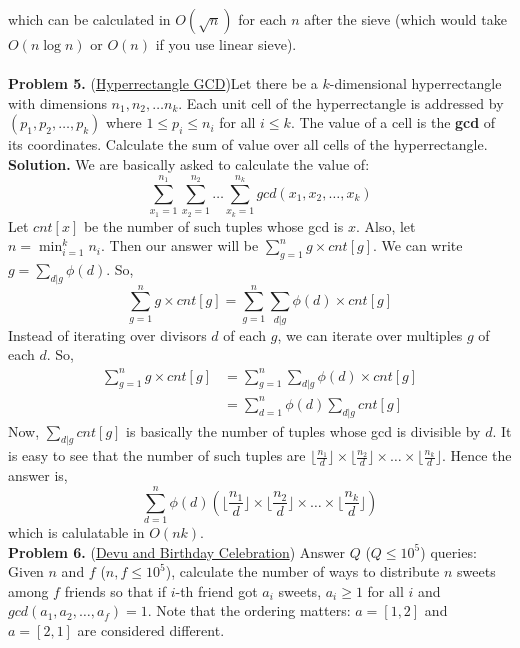 \documentclass[11pt]{article}
\begin{document}
which can be calculated in $O(\sqrt{n})$ for each $n$ after the sieve (which would take $O(n \log n)$ or $O(n)$ if you use linear sieve). \\ \\
\textbf{Problem 5.} (\href{https://www.hackerrank.com/challenges/hyperrectangle-gcd/problem}{Hyperrectangle GCD})Let there be a $k$-dimensional hyperrectangle with dimensions $n_1, n_2, \dots n_k$. Each unit cell of the hyperrectangle is addressed by $(p_1, p_2, \dots , p_k)$ where $1 \leq p_i \leq n_i$ for all $i \leq k$. The value of a cell is the \textbf{gcd} of its coordinates. Calculate the sum of value over all cells of the hyperrectangle.\\
\textbf{Solution.} We are basically asked to calculate the value of: 
$$ \sum_{x_1 = 1}^{n_1} \sum_{x_2 = 1}^{n_2} \dots \sum_{x_k = 1}^{n_k} gcd(x_1, x_2, \dots, x_k)$$
Let $cnt[x]$ be the number of such tuples whose gcd is $x$. Also, let $n = \min_{i = 1}^{k} n_i$. Then our answer will be $\sum_{g = 1}^{n} g \times cnt[g]$. We can write $g = \sum_{d | g} \phi(d)$. So,
  $$\sum_{g = 1}^{n} g \times cnt[g] = \sum_{g = 1}^{n} \sum_{d | g} \phi(d) \times cnt[g]$$
Instead of iterating over divisors $d$ of each $g$, we can iterate over multiples $g$ of each $d$. So,
\begin{align*}
  \sum_{g = 1}^{n} g \times cnt[g] &= \sum_{g = 1}^{n} \sum_{d | g} \phi(d) \times cnt[g]\\
                                   &= \sum_{d = 1}^{n} \phi(d) \sum_{d | g} cnt[g]
\end{align*}
Now, $\sum_{d | g} cnt[g]$ is basically the number of tuples whose gcd is divisible by $d$. It is easy to see that the number of such tuples are $\lfloor \frac{n_1}{d} \rfloor \times \lfloor \frac{n_2}{d} \rfloor \times \dots \times \lfloor \frac{n_k}{d} \rfloor$. Hence the answer is,
$$\sum_{d = 1}^{n} \phi(d) (\lfloor \frac{n_1}{d} \rfloor \times \lfloor \frac{n_2}{d} \rfloor \times \dots \times \lfloor \frac{n_k}{d} \rfloor)$$
which is calulatable in $O(nk)$. \\
\textbf{Problem 6.} (\href{https://codeforces.com/problemset/problem/439/E}{Devu and Birthday Celebration}) Answer $Q$ ($Q \leq 10^5$) queries: Given $n$ and $f$ ($n, f \leq 10^5$), calculate the number of ways to distribute $n$ sweets among $f$ friends so that if $i$-th friend got $a_i$ sweets, $a_i \geq 1$ for all $i$ and $gcd(a_1, a_2, \dots , a_f) = 1$. Note that the ordering matters: $a = [1, 2]$ and $a = [2, 1]$ are considered different. \\
\end{document}
